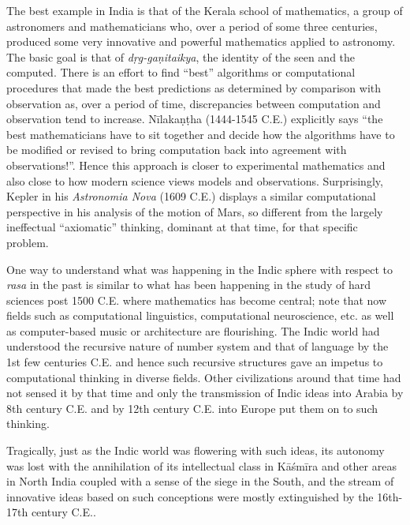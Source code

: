 {The best example in India is that of the Kerala school of mathematics, a group of astronomers and mathematicians who, over a period of some three centuries, produced some very innovative and powerful mathematics applied to astronomy. The basic goal is that of \textsl{dṛg-gaṇitaikya}, the identity of the seen and the computed. There is an effort to find “best” algorithms or computational procedures that made the best predictions as determined by comparison with observation as, over a period of time, discrepancies between computation and observation tend to increase. Nīlakaṇṭha (1444-1545 C.E.) explicitly says “the best mathematicians have to sit together and decide how the algorithms have to be modified or revised to bring computation back into agreement with observations!”. Hence this approach is closer to experimental mathematics and also close to how modern science views models and observations. Surprisingly, Kepler in his \textsl{Astronomia Nova} (1609 C.E.) displays a similar computational perspective in his analysis of the motion of Mars, so different from the largely ineffectual “axiomatic” thinking, dominant at that time, for that specific problem.

One way to understand what was happening in the Indic sphere with respect to \textsl{rasa} in the past is similar to what has been happening in the study of hard sciences post 1500 C.E. where mathematics has become central; note that now fields such as computational linguistics, computational neuroscience, etc. as well as computer-based music or architecture are flourishing. The Indic world had understood the recursive nature of number system and that of language by the 1st few centuries C.E. and hence such recursive structures gave an impetus to computational thinking in diverse fields. Other civilizations around that time had not sensed it by that time and only the transmission of Indic ideas into Arabia by 8th century C.E. and by 12th century C.E. into Europe put them on to such thinking. 

Tragically, just as the Indic world was flowering with such ideas, its autonomy was lost with the annihilation of its intellectual class in Kāśmīra and other areas in North India coupled with a sense of the siege in the South, and the stream of innovative ideas based on such conceptions were mostly extinguished by the 16th-17th century C.E..
}

